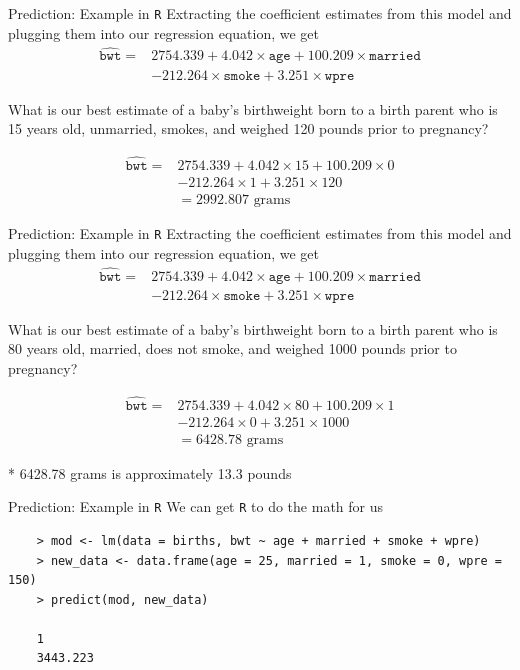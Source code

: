 \documentclass[10pt,t]{beamer}
\begin{document}
\begin{frame}{Prediction: Example in \texttt{R}}
Extracting the coefficient estimates from this model and plugging them into our regression equation, we get
\begin{align*}
	\widehat{\texttt{bwt}} = & 2754.339 + 4.042 \times \texttt{age} + 100.209 \times \texttt{married} \\
	& - 212.264 \times \texttt{smoke} + 3.251 \times \texttt{wpre} 
\end{align*}

What is our best estimate of a baby's birthweight born to a birth parent who is 15 years old, unmarried, smokes, and weighed 120 pounds prior to pregnancy? \pause

\begin{align*}
\widehat{\texttt{bwt}} = & 2754.339 + 4.042 \times 15 + 100.209 \times 0 \\
& - 212.264 \times 1 + 3.251 \times 120  \\
& = 2992.807 \text{ grams}
\end{align*}

\end{frame}

\begin{frame}{Prediction: Example in \texttt{R}}
Extracting the coefficient estimates from this model and plugging them into our regression equation, we get
\begin{align*}
	\widehat{\texttt{bwt}} = & 2754.339 + 4.042 \times \texttt{age} + 100.209 \times \texttt{married} \\
	& - 212.264 \times \texttt{smoke} + 3.251 \times \texttt{wpre} 
\end{align*}

What is our best estimate of a baby's birthweight born to a birth parent who is 80 years old, married, does not smoke, and weighed 1000 pounds prior to pregnancy? \pause

\begin{align*}
\widehat{\texttt{bwt}} = & 2754.339 + 4.042 \times 80 + 100.209 \times 1 \\
& - 212.264 \times 0 + 3.251 \times 1000  \\
& = 6428.78 \text{ grams}
\end{align*}

* 6428.78 grams is approximately 13.3 pounds

\end{frame}

\begin{frame}[fragile]{Prediction: Example in \texttt{R}}
	We can get \texttt{R} to do the math for us
	\small
	\begin{verbatim}
	> mod <- lm(data = births, bwt ~ age + married + smoke + wpre)
	> new_data <- data.frame(age = 25, married = 1, smoke = 0, wpre = 150)
	> predict(mod, new_data)
	
	1 
	3443.223 
	\end{verbatim}
	
\end{frame}
\end{document}
